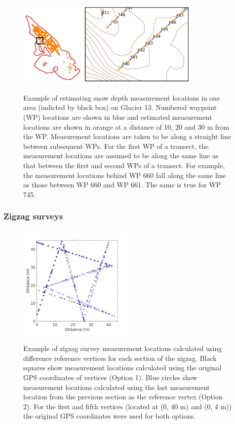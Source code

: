 \documentclass{sfuthesis}
\begin{document}
\begin{figure}
	\centering
	\includegraphics[width = 0.8\textwidth]{transect_measure_locations.jpeg}\\
	\caption{Example of estimating snow depth measurement locations in one area (indicted by black box) on Glacier 13. Numbered waypoint (WP) locations are shown in blue and estimated measurement locations are shown in orange at a distance of 10, 20 and 30 m from the WP. Measurement locations are taken to be along a straight line between subsequent WPs. For the first WP of a transect, the measurement locations are assumed to be along the same line as that between the first and second WPs of a transect. For example, the measurement locations behind WP 660 fall along the same line as those between WP 660 and WP 661. The same is true for WP 745. }
	\label{fig:transect_measure_loc}
\end{figure}

\subsubsection{Zigzag surveys}

\begin{figure}
	\centering
	\includegraphics[width = 0.5\textwidth]{Zigzag_calOptions.png}\\
	\caption{Example of zigzag survey measurement locations calculated using difference reference vertices for each section of the zigzag. Black squares show measurement locations calculated using the original GPS coordinates of vertices (Option 1). Blue circles show measurement locations calculated using the last measurement location from the previous section as the reference vertex (Option 2). For the first and fifth vertices (located at (0, 40 m) and (0, 4 m)) the original GPS coordinates were used for both options. }
	\label{fig:zigzag_location_options}
\end{figure}
\end{document}
